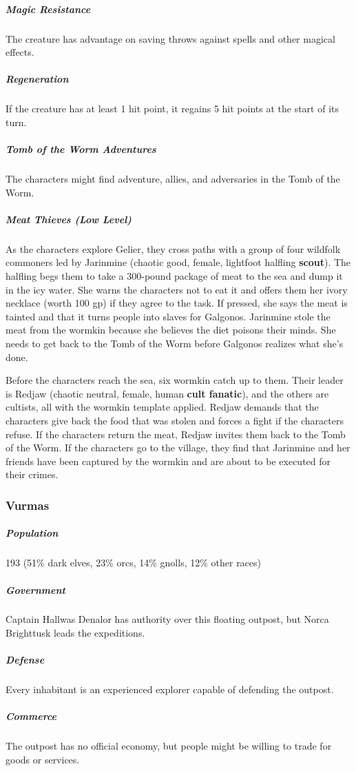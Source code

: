 \documentclass[10pt,a4paper,twoside,bg=print,twocolumn,openany,nodeprecatedcode]{dndbook}
\begin{document}
\subparagraph{Magic Resistance}
The creature has advantage on saving throws against spells and other magical effects.

\subparagraph{Regeneration}
If the creature has at least 1 hit point, it regains 5 hit points at the start of its turn.

\subparagraph{Tomb of the Worm Adventures}
The characters might find adventure, allies, and adversaries in the Tomb of the Worm.

\subparagraph{Meat Thieves (Low Level)}
As the characters explore Gelier, they cross paths with a group of four wildfolk commoners led by Jarinmine (chaotic good, female, lightfoot halfling \textbf{scout}). The halfling begs them to take a 300-pound package of meat to the sea and dump it in the icy water. She warns the characters not to eat it and offers them her ivory necklace (worth 100 gp) if they agree to the task. If pressed, she says the meat is tainted and that it turns people into slaves for Galgonos. Jarinmine stole the meat from the wormkin because she believes the diet poisons their minds. She needs to get back to the Tomb of the Worm before Galgonos realizes what she's done.

Before the characters reach the sea, six wormkin catch up to them. Their leader is Redjaw (chaotic neutral, female, human \textbf{cult fanatic}), and the others are cultists, all with the wormkin template applied. Redjaw demands that the characters give back the food that was stolen and forces a fight if the characters refuse. If the characters return the meat, Redjaw invites them back to the Tomb of the Worm. If the characters go to the village, they find that Jarinmine and her friends have been captured by the wormkin and are about to be executed for their crimes.

\subsubsection{Vurmas}
\subparagraph{Population}
193 (51\% dark elves, 23\% orcs, 14\% gnolls, 12\% other races)

\subparagraph{Government}
Captain Hallwas Denalor has authority over this floating outpost, but Norca Brighttusk leads the expeditions.

\subparagraph{Defense}
Every inhabitant is an experienced explorer capable of defending the outpost.

\subparagraph{Commerce}
The outpost has no official economy, but people might be willing to trade for goods or services.
\end{document}

